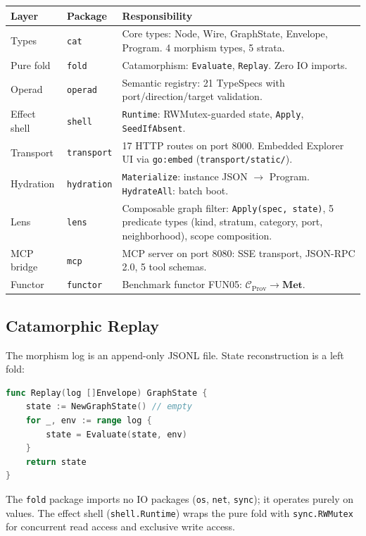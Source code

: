 \documentclass[submission,copyright,creativecommons]{eptcs}
\begin{document}
\begin{center}
\begin{tabular}{@{}llp{5cm}@{}}
\toprule
Layer & Package & Responsibility \\
\midrule
Types      & \texttt{cat}       & Core types: Node, Wire, GraphState, Envelope, Program. 4 morphism types, 5 strata. \\
Pure fold  & \texttt{fold}      & Catamorphism: \texttt{Evaluate}, \texttt{Replay}. Zero IO imports. \\
Operad     & \texttt{operad}    & Semantic registry: 21 TypeSpecs with port/direction/target validation. \\
Effect shell & \texttt{shell}   & \texttt{Runtime}: RWMutex-guarded state, \texttt{Apply}, \texttt{SeedIfAbsent}. \\
Transport  & \texttt{transport} & 17 HTTP routes on port 8000. Embedded Explorer UI via \texttt{go:embed} (\texttt{transport/static/}). \\
Hydration  & \texttt{hydration} & \texttt{Materialize}: instance JSON $\to$ Program. \texttt{HydrateAll}: batch boot. \\
Lens       & \texttt{lens}      & Composable graph filter: \texttt{Apply(spec, state)}, 5 predicate types (kind, stratum, category, port, neighborhood), scope composition. \\
MCP bridge & \texttt{mcp}       & MCP server on port 8080: SSE transport, JSON-RPC 2.0, 5 tool schemas. \\
Functor    & \texttt{functor}   & Benchmark functor FUN05: $\mathcal{C}_{\mathrm{Prov}} \to \mathbf{Met}$. \\
\bottomrule
\end{tabular}
\end{center}

\subsection{Catamorphic Replay}

The morphism log is an append-only JSONL file. State reconstruction is a left
fold:

\begin{lstlisting}[language=Go,caption={Pure replay (simplified)}]
func Replay(log []Envelope) GraphState {
    state := NewGraphState() // empty
    for _, env := range log {
        state = Evaluate(state, env)
    }
    return state
}
\end{lstlisting}

The \texttt{fold} package imports no IO packages (\texttt{os}, \texttt{net},
\texttt{sync}); it operates purely on values. The effect shell
(\texttt{shell.Runtime}) wraps the pure fold with \texttt{sync.RWMutex} for
concurrent read access and exclusive write access.
\end{document}
